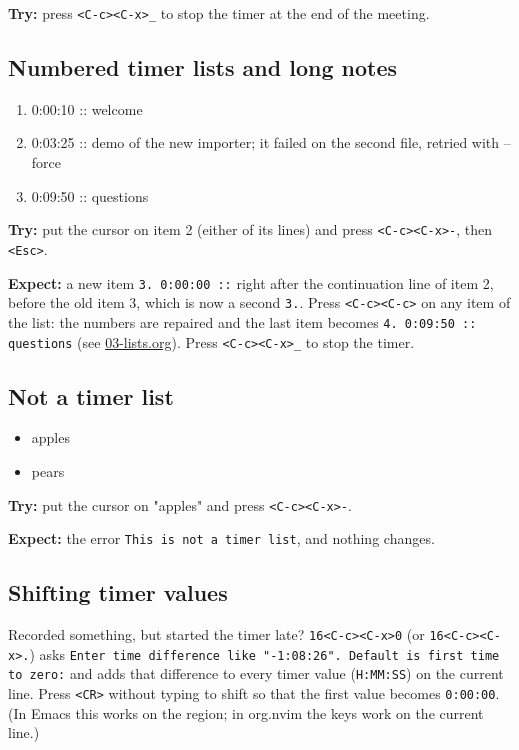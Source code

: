 \textbf{Try:} press \texttt{<C-c><C-x>\_} to stop the timer at the end of the meeting.
\subsection{Numbered timer lists and long notes}
\label{sec:org42f874c}
\begin{enumerate}
\item 0:00:10 :: welcome
\item 0:03:25 :: demo of the new importer;
it failed on the second file, retried with --force
\item 0:09:50 :: questions
\end{enumerate}

\textbf{Try:} put the cursor on item 2 (either of its lines) and press
\texttt{<C-c><C-x>-}, then \texttt{<Esc>}.

\textbf{Expect:} a new item \texttt{3. 0:00:00 ::} right after the continuation line
of item 2, before the old item 3, which is now a second \texttt{3.}. Press
\texttt{<C-c><C-c>} on any item of the list: the numbers are repaired and the last
item becomes \texttt{4. 0:09:50 :: questions} (see \href{03-lists.org}{03-lists.org}).
Press \texttt{<C-c><C-x>\_} to stop the timer.
\subsection{Not a timer list}
\label{sec:org897f433}
\begin{itemize}
\item apples
\item pears
\end{itemize}

\textbf{Try:} put the cursor on "apples" and press \texttt{<C-c><C-x>-}.

\textbf{Expect:} the error \texttt{This is not a timer list}, and nothing changes.
\subsection{Shifting timer values}
\label{sec:org8fc251a}
Recorded something, but started the timer late? \texttt{16<C-c><C-x>0} (or
\texttt{16<C-c><C-x>.}) asks
\texttt{Enter time difference like "-1:08:26".  Default is first time to zero:}
and adds that difference to every timer value (\texttt{H:MM:SS}) on the current
line. Press \texttt{<CR>} without typing to shift so that the first value becomes
\texttt{0:00:00}. (In Emacs this works on the region; in org.nvim the keys work on
the current line.)

